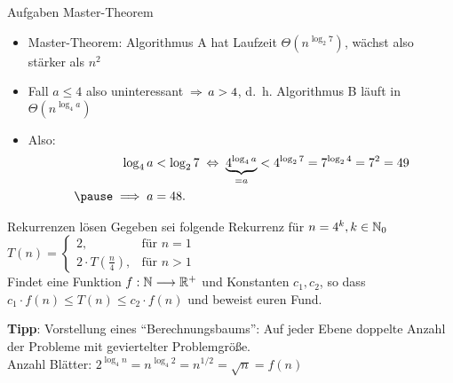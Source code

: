 \begin{frame}{Aufgaben Master-Theorem}
	\solutionheading 
	\begin{itemize}
		\item Master-Theorem: Algorithmus A hat Laufzeit $\Theta(n^{\log _{2}7})$, wächst also stärker als $n^2$
		\pause
		\item Fall $a \leq 4$ also uninteressant $\impl a > 4$, d.~h. Algorithmus B läuft in $\Theta(n^{\log _{4}a})$ \\
		\pause 
		\item Also: 
		\begin{align*}
			\log_{4}a &< \log_{2}7 \gdw \underbrace{4^{\log_{4}a}}_{= a} < 4^{\log_{2}7} = 7^{\log_{2} 4} = 7^2 = 49 \\ \pause  %
			\Impl a &= 48.
		\end{align*}
	\end{itemize}
\end{frame}


\begin{frame}{Rekurrenzen lösen}
	Gegeben sei folgende Rekurrenz für $n = 4^k, k \in \mathbb{N}_0$ \\[0,5cm]
	\begin{math}
	T(n) = 
	\begin{cases}
	2,                       & \text{für } n = 1 \\
	2 \cdot T(\frac{n}{4}),  & \text{für } n > 1
	\end{cases}
	\end{math} \\[0,5cm]
	Findet eine Funktion $f : \mathbb{N} \longrightarrow \mathbb{R}^+$ und Konstanten $c_1, c_2$, so dass $c_1 \cdot f(n) \leq T(n) \leq c_2 \cdot f(n)$ und beweist euren Fund.
	
	\pause
	\bigskip
	\textbf{Tipp}: Vorstellung eines \enquote{Berechnungsbaums}: Auf jeder Ebene doppelte Anzahl der Probleme mit geviertelter Problemgröße.\\ \pause
	\impl Anzahl Blätter: \quad $2^{\log_{4}n} = n^{\log_{4}2} = n^{1/2} = \sqrt{n} = f(n)$ 
\end{frame}

